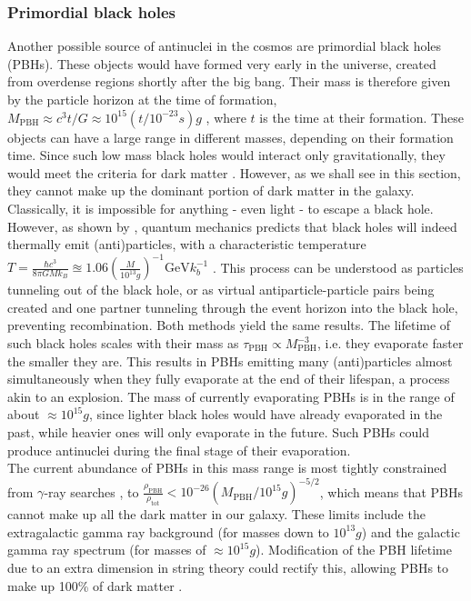 \subsubsection{Primordial black holes}\label{Res:PBH}
Another possible source of antinuclei in the cosmos are primordial black holes (PBHs). These objects would have formed very early in the universe, created from overdense regions shortly after the big bang. Their mass is therefore given by the particle horizon at the time of formation, $M_\mathrm{PBH} \approx c^3t/G \approx 10^{15} (t/10^{-23}s)g$ \cite{HAWKING1974, Hawking_PBH}, where $t$ is the time at their formation. These objects can have a large range in different masses, depending on their formation time. Since such low mass black holes would interact only gravitationally, they would meet the criteria for dark matter \cite{Serksnyte:2022onw, Hawking_PBH}. However, as we shall see in this section, they cannot make up the dominant portion of dark matter in the galaxy. \\
Classically, it is impossible for anything - even light - to escape a black hole. However, as shown by \cite{HAWKING1974}, quantum mechanics predicts that black holes will indeed thermally emit (anti)particles, with a characteristic temperature $T = \frac{\hbar c^3}{8\pi GM k_B} \approxeq 1.06 \left( \frac{M}{10^{13}g}\right)^{-1} \mathrm{GeV} k_b^{-1}$ . This process can be understood as particles tunneling out of the black hole, or as virtual antiparticle-particle pairs being created and one partner tunneling through the event horizon into the black hole, preventing recombination. Both methods yield the same results. The lifetime of such black holes scales with their mass as $\tau_\mathrm{PBH} \propto M_\mathrm{PBH}^{-3}$, i.e. they evaporate faster the smaller they are. This results in PBHs emitting many (anti)particles almost simultaneously when they fully evaporate at the end of their lifespan, a process akin to an explosion. The mass of currently evaporating PBHs is in the range of about $\approx 10^{15}g$, since lighter black holes would have already evaporated in the past, while heavier ones will only evaporate in the future. Such PBHs could produce antinuclei during the final stage of their evaporation. \\
The current abundance of PBHs in this mass range is most tightly constrained from $\gamma$-ray searches \cite{FermiLAT_Point_Sources}, to $\frac{\rho_\mathrm{PBH}}{\rho_\mathrm{tot}} < 10^{-26} (M_\mathrm{PBH}/10^{15}g)^{-5/2}$, which means that PBHs cannot make up all the dark matter in our galaxy. These limits include the extragalactic gamma ray background (for masses down to $10^{13}g$) and the galactic gamma ray spectrum (for masses of $\approx 10^{15}g$). Modification of the PBH lifetime due to an extra dimension in string theory could rectify this, allowing PBHs to make up 100\% of dark matter \cite{5d_PBHs}.\\

